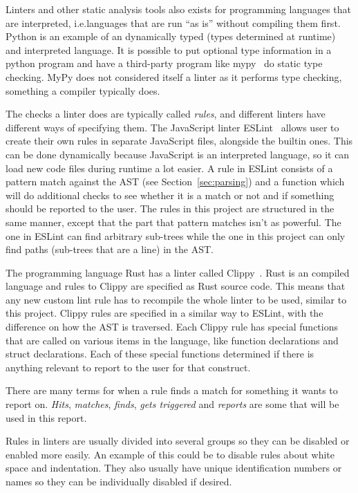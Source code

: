 \documentclass[a4paper,12pt]{article}
\begin{document}
Linters and other static analysis tools also exists for programming languages that are
interpreted, i.e.\@ languages that are run ``as is'' without compiling them first. Python
is an example of an dynamically typed (types determined at runtime) and interpreted
language. It is possible to put optional type information in a python program and have a
third-party program like mypy~\cite{mypy} do static type checking. MyPy does not
considered itself a linter as it performs type checking, something a compiler typically
does.

The checks a linter does are typically called \emph{rules}, and different linters have
different ways of specifying them. The JavaScript linter ESLint~\cite{ESLint} allows user
to create their own rules in separate JavaScript files, alongside the builtin ones. This
can be done dynamically because JavaScript is an interpreted language, so it can load new
code files during runtime a lot easier. A rule in ESLint
consists of a pattern match against the AST (see Section~\ref{sec:parsing}) and a function
which will do additional checks to see whether it is a match or not and if something
should be reported to the user. The rules in this project are structured in the same
manner, except that the part that pattern matches isn't as powerful. The one in ESLint can
find arbitrary sub-trees while the one in this project can only find paths (sub-trees that
are a line) in the AST.

The programming language Rust has a linter called Clippy~\cite{Clippy}. Rust is an
compiled language and rules to Clippy are specified as Rust source code. This means that
any new custom lint rule has to recompile the whole linter to be used, similar to this
project. Clippy rules are specified in a similar way to ESLint, with the difference on how
the AST is traversed. Each Clippy rule has special functions that are called on various
items in the language, like function declarations and struct declarations. Each of these
special functions determined if there is anything relevant to report to the user for that
construct.

There are many terms for when a rule finds a match for something it wants to report on.
\emph{Hits}, \emph{matches}, \emph{finds}, \emph{gets triggered} and \emph{reports} are
some that will be used in this report.

Rules in linters are usually divided into several groups so they can be disabled or
enabled more easily. An example of this could be to disable rules about white space and
indentation.
They also usually have unique identification numbers or names so they can be individually
disabled if desired.
\end{document}
